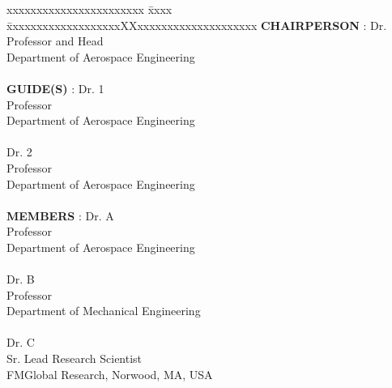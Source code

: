 \committee
\label{cmte}

\begin{tabbing}
	xxxxxxxxxxxxxxxxxxxxxxx \= xxxx \= xxxxxxxxxxxxxxxxxxxXXxxxxxxxxxxxxxxxxxxxx \kill
	\textbf{CHAIRPERSON}   \>:\> Dr. 
	\\ \> \> Professor and Head
	\\ \> \> Department of Aerospace Engineering \\
	\\ %
	\textbf{GUIDE(S)}   \>:\> Dr. 1
	\\ \> \> Professor
	\\ \> \> Department of Aerospace Engineering
	\\ %
	\\ \> \> Dr. 2
	\\ \> \> Professor
	\\ \> \> Department of Aerospace Engineering \\
	\\ %
	\textbf{MEMBERS}   \>:\> Dr. A
	\\ \> \> Professor
	\\ \> \> Department of Aerospace Engineering 
	\\ %
	\\ \> \> Dr. B
	\\ \> \> Professor
	\\ \> \> Department of Mechanical Engineering 
	\\ %
	\\ \> \> Dr. C
	\\ \> \> Sr. Lead Research Scientist
	\\ \> \> FMGlobal Research, Norwood, MA, USA

	\\
	
\end{tabbing}